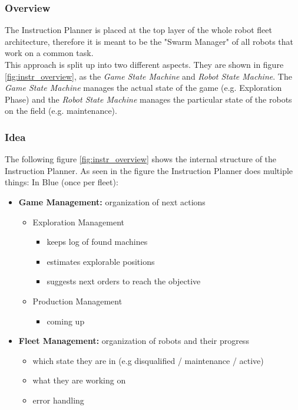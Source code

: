 

\subsubsection{Overview}
The Instruction Planner is placed at the top layer of the whole robot fleet architecture,
therefore it is meant to be the "Swarm Manager" of all robots that work on a common task. \\
This approach is split up into two different aspects. They are shown in figure \ref{fig:instr_overview}, as the \textit{Game State Machine} and \textit{Robot State Machine}.
The \textit{Game State Machine} manages the actual state of the game (e.g. Exploration Phase) and the \textit{Robot State Machine} manages the particular state of the robots on the field (e.g. maintenance).

\subsubsection{Idea}

The following figure \ref{fig:instr_overview} shows the internal structure of the
Instruction Planner.
As seen in the figure the Instruction Planner does multiple things: \newpage
In Blue (once per fleet):\\
\begin{itemize}
    \item \textbf{Game Management:}  organization of next actions
    \begin{itemize}
        \item Exploration Management
            \begin{itemize}
                \item keeps log of found machines
                \item estimates explorable positions
                \item suggests next orders to reach the objective
            \end{itemize}
        \item Production Management
        \begin{itemize}
            \item coming up
        \end{itemize}
    \end{itemize}
    \item \textbf{Fleet Management:} organization of robots and their progress
    \begin{itemize}
        \item which state they are in (e.g disqualified / maintenance / active)
        \item what they are working on
        \item error handling
    \end{itemize}
\end{itemize}

